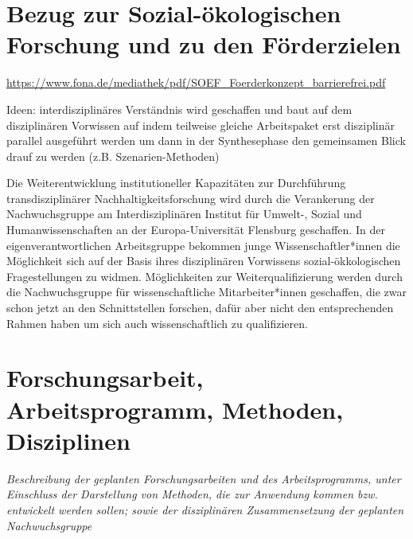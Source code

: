 \documentclass[a4paper,11pt,twoside]{scrartcl}
\begin{document}
 

\section{Bezug zur Sozial-ökologischen Forschung und zu den Förderzielen}

\url{https://www.fona.de/mediathek/pdf/SOEF_Foerderkonzept_barrierefrei.pdf}

Ideen:
interdisziplinäres Verständnis wird geschaffen und baut auf dem disziplinären Vorwissen auf indem teilweise gleiche Arbeitspaket erst disziplinär parallel ausgeführt werden um dann in der Synthesephase den gemeinsamen Blick drauf zu werden (z.B. Szenarien-Methoden)

Die Weiterentwicklung institutioneller Kapazitäten zur Durchführung transdisziplinärer Nachhaltigkeitsforschung wird durch die Verankerung der Nachwuchsgruppe am Interdisziplinären Institut für Umwelt-, Sozial und Humanwissenschaften an der Europa-Universität Flensburg geschaffen. In der eigenverantwortlichen Arbeitsgruppe bekommen junge Wissenschaftler*innen die Möglichkeit sich auf der Basis ihres disziplinären Vorwissens sozial-ökkologischen Fragestellungen zu  widmen. Möglichkeiten zur Weiterqualifizierung werden durch die  Nachwuchsgruppe für wissenschaftliche Mitarbeiter*innen geschaffen, die zwar schon jetzt an den Schnittstellen forschen, dafür aber nicht den entsprechenden Rahmen haben um sich auch wissenschaftlich zu qualifizieren.

\section{Forschungsarbeit, Arbeitsprogramm, Methoden, Disziplinen}
\textit{Beschreibung der geplanten Forschungsarbeiten und des Arbeitsprogramms, unter Einschluss der Darstellung von Methoden, die zur Anwendung kommen bzw. entwickelt werden sollen; sowie der disziplinären Zusammensetzung der geplanten Nachwuchsgruppe}
\end{document}
